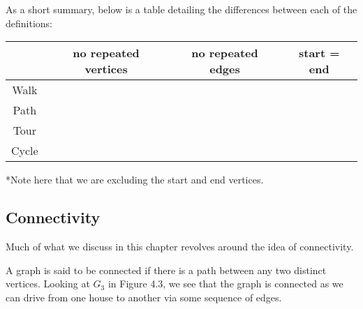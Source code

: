 \documentclass[openany]{book}
\begin{document}
As a short summary, below is a table detailing the differences between each of the definitions:
\begin{center}
	\begin{tabular}{cccc}
		& no repeated vertices & no repeated edges & start = end \\
		\hline
		Walk & & & \\
		\hline
		Path & \checkmark & \checkmark & \\
		\hline
		Tour & & & \checkmark \\
		\hline
		Cycle & \checkmark* & \checkmark & \checkmark \\
	\end{tabular}
\end{center}
\begin{rmk}
	*Note here that we are excluding the start and end vertices.
\end{rmk}

\subsection{Connectivity}
Much of what we discuss in this chapter revolves around the idea of connectivity.
\begin{defn}[Connectivity]
	A graph is said to be connected if there is a path between any two distinct vertices. Looking at $G_{3}$ in Figure 4.3, we see that the graph is connected as we can drive from one house to another via some sequence of edges.
\end{defn}
\end{document}
